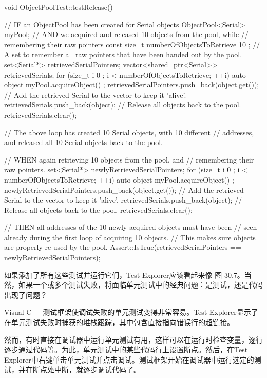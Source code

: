 \begin{cpp}
void ObjectPoolTest::testRelease()
{
    // IF an ObjectPool has been created for Serial objects
    ObjectPool<Serial> myPool;
    // AND we acquired and released 10 objects from the pool, while
    //     remembering their raw pointers
    const size_t numberOfObjectsToRetrieve { 10 };
    // A set to remember all raw pointers that have been handed out by the pool.
    set<Serial*> retrievedSerialPointers;
    vector<shared_ptr<Serial>> retrievedSerials;
    for (size_t i { 0 }; i < numberOfObjectsToRetrieve; ++i) {
        auto object { myPool.acquireObject() };
        retrievedSerialPointers.push_back(object.get());
        // Add the retrieved Serial to the vector to keep it 'alive'.
        retrievedSerials.push_back(object);
    }
    // Release all objects back to the pool.
    retrievedSerials.clear();

    // The above loop has created 10 Serial objects, with 10 different
    // addresses, and released all 10 Serial objects back to the pool.

    // WHEN again retrieving 10 objects from the pool, and
    //      remembering their raw pointers.
    set<Serial*> newlyRetrievedSerialPointers;
    for (size_t i { 0 }; i < numberOfObjectsToRetrieve; ++i) {
        auto object { myPool.acquireObject() };
        newlyRetrievedSerialPointers.push_back(object.get());
        // Add the retrieved Serial to the vector to keep it 'alive'.
        retrievedSerials.push_back(object);
    }
    // Release all objects back to the pool.
    retrievedSerials.clear();

    // THEN all addresses of the 10 newly acquired objects must have been
    //      seen already during the first loop of acquiring 10 objects.
    //      This makes sure objects are properly re-used by the pool.
    Assert::IsTrue(retrievedSerialPointers == newlyRetrievedSerialPointers);
}
\end{cpp}

如果添加了所有这些测试并运行它们，Test Explorer应该看起来像 图 30.7。当然，如果一个或多个测试失败，将面临单元测试中的经典问题：是测试，还是代码出现了问题？



Visual C++测试框架使调试失败的单元测试变得非常容易。Test Explorer显示了在单元测试失败时捕获的堆栈跟踪，其中包含直接指向错误行的超链接。

然而，有时直接在调试器中运行单元测试有用，这样可以在运行时检查变量，逐行逐步通过代码等。为此，单元测试中的某些代码行上设置断点。然后，在Test Explorer中右键单击单元测试并点击调试。测试框架开始在调试器中运行选定的测试，并在断点处中断，就逐步调试代码了。

